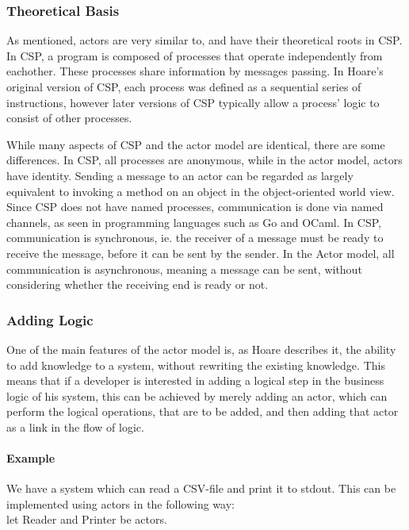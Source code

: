 \subsubsection{Theoretical Basis} 
As mentioned, actors are very similar to, and have their theoretical roots in CSP.
In CSP, a program is composed of processes that operate independently from eachother. These processes share information by messages passing. In Hoare's original version of CSP, each process was defined as a sequential series of instructions, however later versions of CSP typically allow a process' logic to consist of other processes.

While many aspects of CSP and the actor model are identical, there are some differences. In CSP, all processes are anonymous, while in the actor model, actors have identity. Sending a message to an actor can be regarded as largely equivalent to invoking a method on an object in the object-oriented world view. Since CSP does not have named processes, communication is done via named channels, as seen in programming languages such as Go and OCaml. 
In CSP, communication is synchronous, ie. the receiver of a message must be ready to receive the message, before it can be sent by the sender. In the Actor model, all communication is asynchronous, meaning a message can be sent, without considering whether the receiving end is ready or not.

\subsubsection{Adding Logic}
One of the main features of the actor model is, as Hoare describes it, the ability to add knowledge to a system, without rewriting the existing knowledge. This means that if a developer is interested in adding a logical step in the business logic of his system, this can be achieved by merely adding an actor, which can perform the logical operations, that are to be added, and then adding that actor as a link in the flow of logic.

\paragraph{Example}
We have a system which can read a CSV-file and print it to stdout. This can be implemented using actors in the following way:\\
let Reader and Printer be actors.

